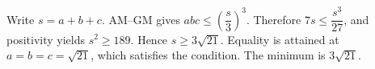 Write $s=a+b+c$. AM--GM gives $abc\le(\dfrac{s}{3})^3$. Therefore $7s\le\dfrac{s^3}{27}$, and positivity yields $s^2\ge189$. Hence $s\ge3\sqrt{21}$. Equality is attained at $a=b=c=\sqrt{21}$, which satisfies the condition. The minimum is $\boxed{3\sqrt{21}}$.
